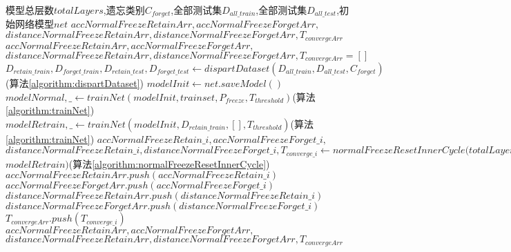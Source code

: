 \begin{algorithm}
	\renewcommand{\algorithmicrequire}{\textbf{Input:}}
	\renewcommand{\algorithmicensure}{\textbf{Output:}}
	\caption{正向冻结算法-外循环 normalResetMain}
	\label{algorithm:normalResetMain}
	\begin{algorithmic}[1]
        \REQUIRE 模型总层数$totalLayers$,遗忘类别$C_{forget}$,全部测试集$D_{all\_train}$,全部测试集$D_{all\_test}$,初始网络模型$net$
        \ENSURE  $accNormalFreezeRetainArr,accNormalFreezeForgetArr,$\\$distanceNormalFreezeRetainArr,distanceNormalFreezeForgetArr,T_{convergeArr}$
        \STATE $accNormalFreezeRetainArr,accNormalFreezeForgetArr,$\\$distanceNormalFreezeRetainArr,distanceNormalFreezeForgetArr,T_{convergeArr} = []$
        \STATE $D_{retain\_train}, D_{forget\_train}, D_{retain\_test}, D_{forget\_test} \gets dispartDataset(D_{all\_train}, D_{all\_test}, C_{forget})$(算法\ref{algorithm:dispartDataset})
        \STATE $modelInit \gets net.saveModel()$
        \STATE $modelNormal,\_ \gets trainNet(modelInit, trainset, P_{freeze}, T_{threshold})$(算法\ref{algorithm:trainNet})
        \STATE $modelRetrain,\_ \gets trainNet(modelInit, D_{retain\_train}, [], T_{threshold})$(算法\ref{algorithm:trainNet})
            \STATE $accNormalFreezeRetain\_i,accNormalFreezeForget\_i,$\\
            $distanceNormalFreezeRetain\_i,distanceNormalFreezeForget\_i,T_{converge\_i} \gets normalFreezeResetInnerCycle(totalLayers, i, C_{forget}, D_{retain\_train}, D_{retain\_test}, D_{forget\_test}, $\\$modelRetrain)$(算法\ref{algorithm:normalFreezeResetInnerCycle})
            \STATE $accNormalFreezeRetainArr.push(accNormalFreezeRetain\_i)$
            \STATE $accNormalFreezeForgetArr.push(accNormalFreezeForget\_i)$
            \STATE $distanceNormalFreezeRetainArr.push(distanceNormalFreezeRetain\_i)$
            \STATE $distanceNormalFreezeForgetArr.push(distanceNormalFreezeForget\_i)$
            \STATE $T_{convergeArr}.push(T_{converge\_i})$
        \ENDFOR
        \RETURN $accNormalFreezeRetainArr,accNormalFreezeForgetArr,$\\$distanceNormalFreezeRetainArr,distanceNormalFreezeForgetArr,T_{convergeArr}$
	\end{algorithmic}  
\end{algorithm}
